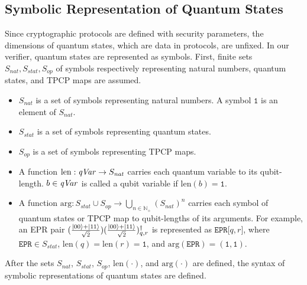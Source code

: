 \subsection{Symbolic Representation of Quantum States}
Since cryptographic protocols are defined with security parameters,
the dimensions of quantum states, which are data in protocols,
are unfixed. In our verifier, quantum states are represented as
symbols. First, finite sets
$S_{\mathit{nat}},
S_{\mathit{stat}},
S_{\mathit{op}}$ of symbols respectively
representing
natural numbers, quantum states, and TPCP maps are assumed. 
\begin{itemize}
 \item $S_{\mathit{nat}}$ is a set of symbols representing
       natural numbers. A symbol $\mathtt{1}$ is
       an element of $S_{\mathit{nat}}$.
 \item $S_{\mathit{stat}}$ is a set of symbols representing quantum
       states.
 \item $S_{\mathit{op}}$ is a set of symbols representing TPCP maps.
 \item A function $\mathrm{len}:\mathit{qVar} \rightarrow
       S_{\mathit{nat}}$ carries each quantum variable to its 
       qubit-length. $b \in \mathit{qVar}$ is called
       a qubit variable if $\mathrm{len}(b) = \mathtt{1}$.
 \item A function $\mathrm{arg}:S_{\mathit{stat}} \cup
       S_{\mathit{op}} \rightarrow \bigcup_{n \in
       \mathbb{N_{+}}}(S_{\mathit{nat}})^n$ carries
       each symbol of quantum states or TPCP map to
       qubit-lengths of its arguments. For example,
       an EPR pair $(\frac{|00\rangle+|11\rangle}{\sqrt{2}})
       (\frac{|00\rangle+|11\rangle}{\sqrt{2}})_{q,r}^\dagger$
       is represented as
       $\texttt{EPR[}q,r\texttt{]}$, where $\mathtt{EPR} \in
       S_{\mathit{stat}}$,
       $\mathrm{len}(q)=\mathrm{len}(r)=\mathtt{1}$, and
       $\mathrm{arg}(\mathtt{EPR})=(\mathtt{1},\mathtt{1})$.
\end{itemize}

After the sets $S_{\mathit{nat}}$,
$S_{\mathit{stat}}$, $S_{\mathit{op}}$, $\mathrm{len}(\cdot)$, and
$\mathrm{arg}(\cdot)$ are defined,
the syntax of symbolic representations of quantum states are
defined.


